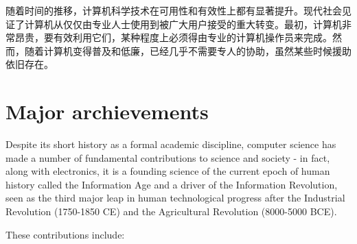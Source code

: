 随着时间的推移，计算机科学技术在可用性和有效性上都有显著提升。现代社会见证了计算机从仅仅由专业人士使用到被广大用户接受的重大转变。最初，计算机非常昂贵，要有效利用它们，某种程度上必须得由专业的计算机操作员来完成。然而，随着计算机变得普及和低廉，已经几乎不需要专人的协助，虽然某些时候援助依旧存在。

\section{Major archievements}

Despite its short history as a formal academic discipline, computer science has made a number of fundamental contributions to science and society - in fact, along with electronics, it is a founding science of the current epoch of human history called the Information Age and a driver of the Information Revolution, seen as the third major leap in human technological progress after the Industrial Revolution (1750-1850 CE) and the Agricultural Revolution (8000-5000 BCE).

These contributions include:


